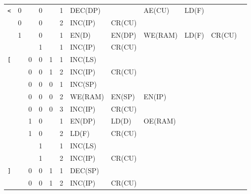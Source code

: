 \begin{longtable}[c] {c|cccc|c|llllll}
    \rowcolor{White} \texttt{<}   & 0 &   & 0     &      & 1     & DEC(DP)  &          & AE(CU)  & LD(F)  &        &        \\
    \rowcolor{White}              & 0 &   & 0     &      & 2     & INC(IP)  & CR(CU)   &         &        &        &        \\
    \rowcolor{Gray}               & 1 &   & 0     &      & 1     & EN(D)    & EN(DP)   & WE(RAM) & LD(F)  & CR(CU) &        \\
    \rowcolor{White}              &   &   & 1     &      & 1     & INC(IP)  & CR(CU)   &         &        &        &        \\ \hline
    
    \rowcolor{Gray}  \texttt{[}   &   & 0 & 0     & 1    & 1     & INC(LS)  &          &         &        &        &        \\
    \rowcolor{Gray}               &   & 0 & 0     & 1    & 2     & INC(IP)  & CR(CU)   &         &        &        &        \\      
    \rowcolor{White}              &   & 0 & 0     & 0    & 1     & INC(SP)  &          &         &        &        &        \\
    \rowcolor{White}              &   & 0 & 0     & 0    & 2     & WE(RAM)  & EN(SP)   & EN(IP)  &        &        &        \\
    \rowcolor{White}              &   & 0 & 0     & 0    & 3     & INC(IP)  & CR(CU)   &         &        &        &        \\
    \rowcolor{Gray}               &   & 1 & 0     &      & 1     & EN(DP)   & LD(D)    & OE(RAM) &        &        &        \\
    \rowcolor{Gray}               &   & 1 & 0     &      & 2     & LD(F)    & CR(CU)   &         &        &        &        \\
    \rowcolor{White}              &   &   & 1     &      & 1     & INC(LS)  &          &         &        &        &        \\
    \rowcolor{White}              &   &   & 1     &      & 2     & INC(IP)  & CR(CU)   &         &        &        &        \\ \hline
    
    \rowcolor{White} \texttt{]}   &   & 0 & 0     & 1    & 1     & DEC(SP)  &          &         &        &        &        \\
    \rowcolor{White}              &   & 0 & 0     & 1    & 2     & INC(IP)  & CR(CU)   &         &        &        &        \\
        

\end{longtable}
